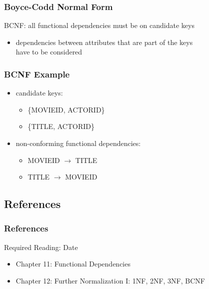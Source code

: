 \documentclass[dvipsnames]{beamer}
\begin{document}
\begin{frame}
  \frametitle{Boyce-Codd Normal Form}

  \begin{definition}
    \alert{BCNF}: all functional dependencies must be on candidate keys
  \end{definition}

  \pause
  \begin{itemize}
    \item dependencies between attributes that are part of the keys\\
      have to be considered
  \end{itemize}
\end{frame}

\begin{frame}
  \frametitle{BCNF Example}

  \begin{example}
    \begin{itemize}
      \item candidate keys:
      \begin{itemize}
        \item \{MOVIEID, ACTORID\}
        \item \{TITLE, ACTORID\}
      \end{itemize}

      \pause
      \item non-conforming functional dependencies:
      \begin{itemize}
        \item MOVIEID $\rightarrow$ TITLE
        \item TITLE $\rightarrow$ MOVIEID
      \end{itemize}
    \end{itemize}
  \end{example}
\end{frame}

\subsection*{References}

\begin{frame}
  \frametitle{References}

  \begin{block}{Required Reading: Date}
    \begin{itemize}
      \item Chapter 11: \alert{Functional Dependencies}
      \item Chapter 12: \alert{Further Normalization I: 1NF, 2NF, 3NF, BCNF}
    \end{itemize}
  \end{block}
\end{frame}
\end{document}
